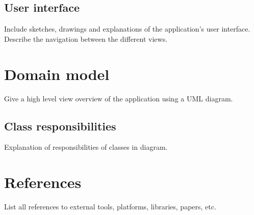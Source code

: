 \documentclass[12pt,a4paper]{scrartcl}
\begin{document}
\subsection{User interface}

Include sketches, drawings and explanations of the application's user interface.
Describe the navigation between the different views. 


\section{Domain model}

Give a high level view overview of the application using a UML diagram.

\subsection{Class responsibilities}

Explanation of responsibilities of classes in diagram.


\section{References}

List all references to external tools, platforms, libraries, papers, etc. 
\end{document}
